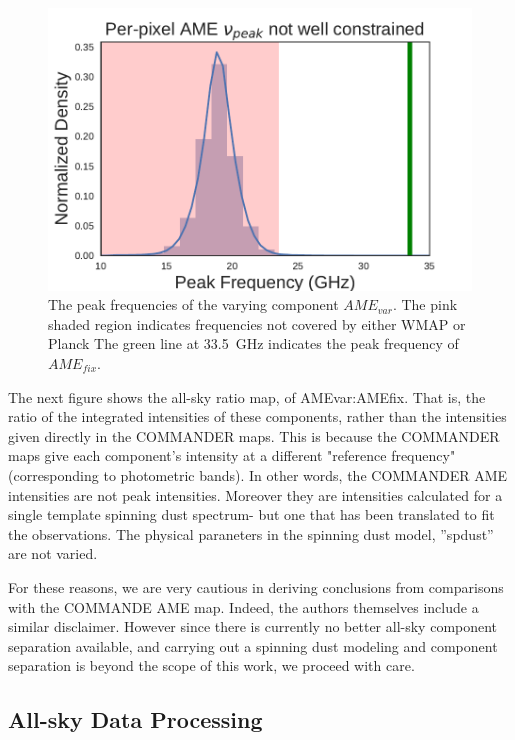       \begin{figure}
        \label{fig:AME_commander_freqdist}
        \includegraphics[width=185mm]{../Plots/AME_commander_freqdist.pdf}
        \centering
        \caption{The peak frequencies of the varying component $AME_{var}$.  The pink shaded region indicates frequencies not covered by either WMAP or Planck The green line at 33.5~GHz indicates the peak frequency of $AME_{fix}$.}
      \end{figure}

      The next figure shows the all-sky ratio map, of AMEvar:AMEfix. That is, the ratio of the integrated intensities of these components, rather than the intensities given directly in the COMMANDER maps. This is because the COMMANDER maps give each component's intensity at a different "reference frequency" (corresponding to photometric bands). In other words, the COMMANDER AME intensities are not peak intensities. Moreover they are intensities calculated for a single template spinning dust spectrum- but one that has been translated to fit the observations. The physical paraneters in the spinning dust model, ''spdust'' are not varied.

      For these reasons, we are very cautious in deriving conclusions from comparisons with the COMMANDE AME map. Indeed, the authors themselves include a similar disclaimer. However since there is currently no better all-sky component separation available, and carrying out a spinning dust modeling and component separation is beyond the scope of this work, we proceed with care.


\subsection{All-sky Data Processing}

